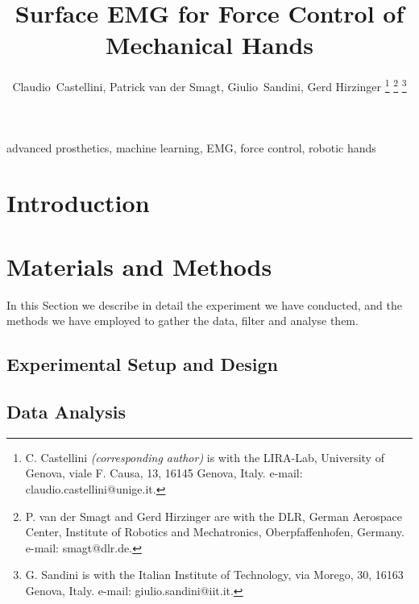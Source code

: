\documentclass[journal]{IEEEtran}
\begin{document}

\title{Surface EMG for Force Control of\\Mechanical Hands}

\author{Claudio~Castellini, Patrick van der Smagt, Giulio~Sandini,
Gerd Hirzinger
\thanks{C. Castellini \emph{(corresponding author)}
  is with the LIRA-Lab, University of Genova,
  viale F. Causa, 13, 16145 Genova, Italy.
  e-mail: claudio.castellini@unige.it.}%
\thanks{P. van der Smagt and Gerd Hirzinger are with the DLR, German Aerospace Center,
  Institute of Robotics and Mechatronics, Oberpfaffenhofen, Germany.
  e-mail: smagt@dlr.de.}%
\thanks{G. Sandini is with the Italian Institute of Technology,
  via Morego, 30, 16163 Genova, Italy.
  e-mail: giulio.sandini@iit.it.}%
}

\maketitle

\begin{abstract}
  
\end{abstract}

\begin{IEEEkeywords}
advanced prosthetics, machine learning, EMG, force control,
robotic hands
\end{IEEEkeywords}

\IEEEpeerreviewmaketitle


\section{Introduction}
\label{sec:introduction}


\section{Materials and Methods}
\label{sec:m&ms}

In this Section we describe in detail the experiment we have
conducted, and the methods we have employed to gather the data, filter
and analyse them.

\subsection{Experimental Setup and Design}
\label{subsec:setup}


\subsection{Data Analysis}
\label{subsec:analysis}

\end{document}
